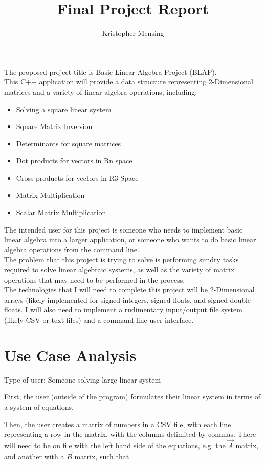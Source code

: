 \documentclass[12pt]{article}
\title{Final Project Report}
\author{Kristopher Mensing}
\begin{document}
\maketitle
The proposed project title is Basic Linear Algebra Project (BLAP). \\

This C++ application will provide a data structure representing 2-Dimensional matrices and a variety of linear algebra operations, including:

\begin{itemize}
	\item Solving a square linear system
	\item Square Matrix Inversion
	\item Determinants for square matrices
	\item Dot products for vectors in Rn space
	\item Cross products for vectors in R3 Space
	\item Matrix Multiplication
	\item Scalar Matrix Multiplication
\end{itemize}

The intended user for this project is someone who needs to implement basic linear algebra into a larger application, or someone who wants to do basic linear algebra operations from the command line.
\\
The problem that this project is trying to solve is performing sundry tasks required to solve linear algebraic systems, as well as the variety of matrix operations that may need to be performed in the process.
\\
The technologies that I will need to complete this project will be 2-Dimensional arrays (likely implemented for signed integers, signed floats, and signed double floats. I will also need to implement a rudimentary input/output file system (likely CSV or text files) and a command line user interface.

\section{Use Case Analysis}
Type of user: Someone solving large linear system

First, the user (outside of the program) formulates their linear system in terms of a system of equations.

Then, the user creates a matrix of numbers in a CSV file, with each line representing a row in the matrix, with the columns delimited by commas. There will need to be on file with the left hand side of the equations, e.g. the $\vec{A}$ matrix, and another with a $\vec{B}$ matrix, such that
 
\end{document}

